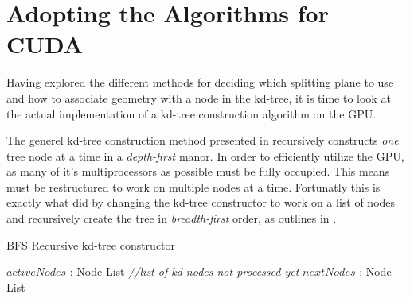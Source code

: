 \section{Adopting the Algorithms for CUDA}


Having explored the different methods for deciding which splitting
plane to use and how to associate geometry with a node in the kd-tree,
it is time to look at the actual implementation of a kd-tree
construction algorithm on the GPU.

The generel kd-tree construction method presented in
 recursively constructs \textit{one} tree
node at a time in a \textit{depth-first} manor. In order to
efficiently utilize the GPU, as many of it's multiprocessors as
possible must be fully occupied. This means 
must be restructured to work on multiple nodes at a time. Fortunatly
this is exactly what \zhou{} did by changing the kd-tree constructor
to work on a list of nodes and recursively create the tree in
\textit{breadth-first} order, as outlines in
.

\begin{algorithm}
  \caption{BFS Recursive kd-tree constructor}
  \label{alg:bfsKDTreeCreator}
  \begin{algorithmic}
              {$activeNodes$ : Node List  \textit{\color{gray}//list of kd-nodes not processed yet}}
              {$nextNodes$ : Node List}
              {
                 \ELSE
                 \ENDIF
               \ENDFOR}
  \end{algorithmic}
\end{algorithm}

